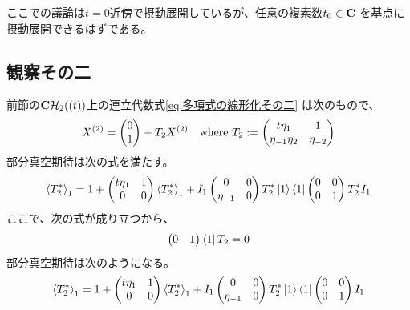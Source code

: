 {	\begin{todo}[摂動展開の基点]\label{todo:摂動展開の基点} %
		ここでの議論は$t=0$近傍で摂動展開しているが、任意の複素数$t_0\in\mathbf{C}$
		を基点に摂動展開できるはずである。
	\end{todo} %
\subsection{観察その二}\label{s2:観察その二} %
	前節の$\mathbf{C}{{\mathcal{H}}}_2((t))$上の連立代数式\eqref{eq:多項式の線形化その二}
	は次のもので、
	\begin{equation*}\begin{split}
		X^{(2)} = \begin{pmatrix}{0}\\{1}\end{pmatrix} + T_{2}X^{(2)} 
		\quad\text{where } T_{2} := \begin{pmatrix}
			t\eta_1 & 1 \\ \eta_{-1}\eta_2 & \eta_{-2}
		\end{pmatrix}
	\end{split}\end{equation*}
	部分真空期待は次の式を満たす。
	\begin{equation*}\begin{split}
		\mathinner{\langle{T_{2}^*}\rangle}_1 = 1 + \begin{pmatrix}
			t\eta_1 & 1 \\ 0 & 0
		\end{pmatrix}\mathinner{\langle{T_{2}^*}\rangle}_1 + I_1\begin{pmatrix}
			0 & 0 \\ \eta_{-1} & 0
		\end{pmatrix}T_{2}^*\mathinner{|{1}\rangle}\mathinner{\langle{1}|}\begin{pmatrix}
			0 & 0 \\ 0 & 1
		\end{pmatrix}T_{2}^*I_1
	\end{split}\end{equation*}
	ここで、次の式が成り立つから、
	\begin{equation*}\begin{split}
		\begin{pmatrix}0 & 1\end{pmatrix}\mathinner{\langle{1}|}T_{2} = 0
	\end{split}\end{equation*}
	部分真空期待は次のようになる。
	\begin{equation*}\begin{split}
		\mathinner{\langle{T_{2}^*}\rangle}_1 = 1 + \begin{pmatrix}
			t\eta_1 & 1 \\ 0 & 0
		\end{pmatrix}\mathinner{\langle{T_{2}^*}\rangle}_1 + I_1\begin{pmatrix}
			0 & 0 \\ \eta_{-1} & 0
		\end{pmatrix}T_{2}^*\mathinner{|{1}\rangle}\mathinner{\langle{1}|}\begin{pmatrix}
			0 & 0 \\ 0 & 1
		\end{pmatrix}I_1
	\end{split}\end{equation*}
}
